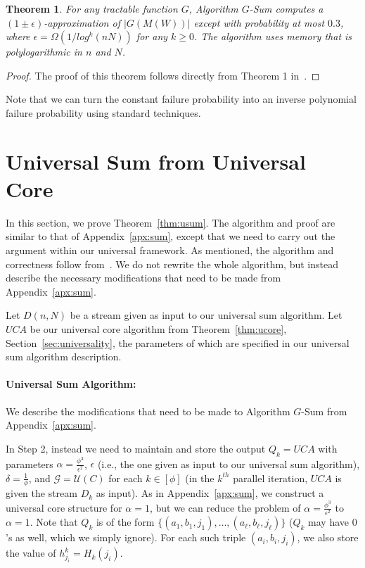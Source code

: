 \documentclass[11pt]{article}
\newtheorem{thm}{Theorem}
\begin{document}
\begin{thm}

For any tractable function $G$, Algorithm $G$-Sum computes a $(1\pm \epsilon)$-approximation of $|G(M(W))|$
except with probability at most $0.3$, where $\epsilon = \Omega(1/log^k(nN))$ for any $k \geq 0$.
The algorithm uses memory that is polylogarithmic in $n$ and $N$.
\end{thm}

\begin{proof}
The proof of this theorem follows directly from Theorem 1 in~\cite{BO13}.
\end{proof}

\noindent Note that we can turn the constant failure probability into an inverse polynomial failure probability
using standard techniques.


\section{Universal Sum from Universal Core}\label{apx:sumcore}

In this section, we prove Theorem~\ref{thm:usum}. The algorithm and proof are similar to that of
Appendix~\ref{apx:sum}, except that we need to carry out the argument within our universal framework.
As mentioned, the algorithm and correctness follow from~\cite{BO13}.  We do not rewrite the whole algorithm,
but instead describe the necessary modifications that need to be made from Appendix~\ref{apx:sum}.

Let $D(n,N)$ be a stream given as input to our universal sum algorithm.
Let $UCA$ be our universal core algorithm from Theorem~\ref{thm:ucore}, Section~\ref{sec:universality},
the parameters of which are specified in our universal sum algorithm description.

\paragraph{Universal Sum Algorithm:} We describe the modifications that need to be made to Algorithm
$G$-Sum from Appendix~\ref{apx:sum}.

In Step 2, instead we need to maintain and store the
output $Q_k = UCA$ with parameters $\alpha = \frac{\phi^3}{\epsilon^2}$, $\epsilon$ (i.e., the one
given as input to our universal sum algorithm), $\delta = \frac{1}{\phi}$, and
$\mathcal{G} = \mathcal{U}(C)$ for each $k \in [\phi]$ (in the $k^{th}$ parallel iteration, $UCA$ is
given the stream $D_k$ as input).  As in Appendix~\ref{apx:sum}, we construct a universal core
structure for $\alpha = 1$, but we can reduce the problem of $\alpha = \frac{\phi^3}{\epsilon^2}$ to $\alpha = 1$.
Note that $Q_k$ is of the form $\{(a_1,b_1,j_1),\ldots,(a_\ell,b_\ell,j_\ell) \}$ ($Q_k$ may have $0$'s as well,
which we simply ignore).  For each such triple $(a_i,b_i,j_i)$, we also store the value of $h^k_{j_i} = H_k(j_i)$.
\end{document}
